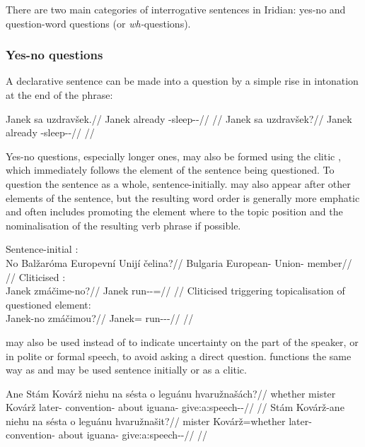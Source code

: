 There are two  main  categories  of  interrogative  sentences in Iridian: yes-no  and  question-word questions (or \emph{wh-}questions).

\subsubsection{Yes-no questions}

A declarative sentence can be made into a question by a simple rise in intonation at the end of the phrase:

\pex
\a
\begingl
\gla Janek sa uzdravšek.//
\glb Janek already \Refl{}-sleep-\Av{}-\Pf{}//
\glft {}//
\endgl
\a
\begingl
\gla Janek sa uzdravšek?//
\glb Janek already \Refl{}-sleep-\Av{}-\Pf{}//
\glft {}//
\endgl
\xe

Yes-no questions, especially longer ones, may also be formed using the clitic , which immediately follows the element of the sentence being questioned. To question the sentence as a whole,  sentence-initially.  may also appear after other elements of the sentence, but the resulting word order is generally more emphatic and often includes promoting the element where  to the topic position and the nominalisation of the resulting verb phrase if possible.


\pex
\a Sentence-initial :\\
  \begingl
  \gla No Bal\v{z}ar\'oma Europevn\'i Unij\'i \v{c}elina?//
  \glb \Q{} Bulgaria European-\Att{} Union-\Gen{} member//
  \glft {}//
  \endgl
\a Cliticised :\\
  \begingl
  \gla Janek zm\'a\v{c}ime-no?//
  \glb Janek run-\Av{}-\Prog{}=\Q{}//
  \glft {}//
  \endgl
\a Cliticised  triggering topicalisation of questioned element:\\
  \begingl
  \gla Janek-no zm\'a\v{c}imou?//
  \glb Janek=\Q{} run-\Av{}-\Prog{}-\Nz{}//
  \glft {}//
  \endgl
\xe

 may also be used instead of  to indicate uncertainty on the part of the speaker, or in polite or formal speech, to avoid asking a direct question.  functions the same way as  and may be used sentence initially or as a clitic.

\pex
\a\begingl
  \gla Ane St\'am Kov\'ar\v{z} niehu na s\'esta o legu\'anu hvaru\v{z}na\v{s}\'ach?//
  \glb whether mister Kov\'ar\v{z} later-\Ins{} \Loc{} convention-\Pat{} about iguana-\Ins{} give:a:speech-\Av{}-\Ctp{}//
  \glft {}//
  \endgl
\a\begingl
  \gla St\'am Kov\'ar\v{z}-ane niehu na s\'esta o legu\'anu hvaru\v{z}na\v{s}it?//
  \glb mister Kov\'ar\v{z}=whether later-\Ins{} \Loc{} convention-\Pat{} about iguana-\Ins{} give:a:speech-\Av{}-\Sup{}//
  \glft {}//
  \endgl
\xe

